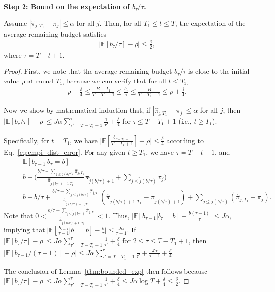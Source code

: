 \textbf{Step 2: Bound on the expectation of $b_{\tau}/\tau$.}
\begin{lemma} \label{thm:bounded_exp}
Assume $|\hat{\pi}_{j,T_1} - \pi_j| \leq \alpha$ for all $j$. Then, for all $T_1 \leq t \leq T$, the expectation of the average remaining budget satisfies
\begin{eqnarray}
|\mathbb{E}[b_{\tau}/\tau] - \rho| \leq \frac{\delta}{2},
\end{eqnarray}
where $\tau = T- t + 1$.
\end{lemma}
\begin{proof}
First, we note that the average remaining budget $b_{\tau}/\tau$ is close to the initial value $\rho$ at round $T_1$, because we can verify that for all $t \leq T_1$,
\begin{eqnarray} \label{eq:empi_dist_error}
\rho - \frac{\delta}{4}\leq \frac{B - T_1}{T-T_1+1} \leq \frac{b_{\tau}}{\tau} \leq \frac{B}{T-T_1+1} \leq \rho + \frac{\delta}{4}.
\end{eqnarray}

Now we show by mathematical induction that, if $|\hat{\pi}_{j,T_1} - \pi_j| \leq \alpha$ for all $j$, then $|\mathbb{E}[b_{\tau}/\tau] - \rho| \leq J\alpha\sum_{\tau' = T-T_1 + 1}^\tau\frac{1}{\tau'} + \frac{\delta}{4}$ for $\tau \leq T - T_1 + 1$ (i.e., $t \geq T_1$).

Specifically, for $t = T_1$, we have $\big|\mathbb{E}[\frac{b_{T-T_1 + 1}}{T-T_1+1}] - \rho\big|  \leq \frac{\delta}{4}$ according to Eq.~\eqref{eq:empi_dist_error}. For any given $t \geq T_1$, we have $\tau = T- t + 1$, and
\begin{eqnarray}
&&\mathbb{E}[b_{\tau - 1}|b_{\tau} = b] \nonumber \\
 &=& b - \bigg(\frac{b/\tau - \sum_{j\leq \tilde{j}(b/\tau)}\hat{\pi}_{j, T_1}}{\hat{\pi}_{\tilde{j}(b/\tau)+1, T_1}} \pi_{\tilde{j}(b/\tau)+1} + \sum_{j\leq \tilde{j}(b/\tau)} \pi_j\bigg) \nonumber \\
&=& b- b/\tau + \frac{b/\tau - \sum_{j\leq \tilde{j}(b/\tau)}\hat{\pi}_{j, T_1}}{\hat{\pi}_{\tilde{j}(b/\tau)+1, T_1}} (\hat{\pi}_{\tilde{j}(b/\tau)+1, T_1} - \pi_{\tilde{j}(b/\tau)+1}) +  \sum_{j\leq \tilde{j}(b/\tau)} (\hat{\pi}_{j,T_1} - \pi_j).\nonumber
\end{eqnarray}
Note that $0 < \frac{b/\tau - \sum_{j\leq \tilde{j}(b/\tau)}\hat{\pi}_{j, T_1}}{\hat{\pi}_{\tilde{j}(b/\tau)+1, T_1}} < 1$. Thus, $\big|\mathbb{E}[b_{\tau - 1}|b_{\tau} = b] - \frac{b(\tau-1)}{\tau}\big| \leq J\alpha$, implying that $\big|\mathbb{E}[\frac{b_{\tau - 1}}{\tau-1}|b_{\tau} = b] - \frac{b}{\tau}\big| \leq \frac{J\alpha}{\tau-1}$.
If $\big|\mathbb{E}[b_{\tau}/\tau] - \rho| \leq J\alpha\sum_{\tau' = T-T_1 + 1}^\tau\frac{1}{\tau'} + \frac{\delta}{4}$ for $2 \leq \tau \leq T - T_1 + 1$, then $\big|\mathbb{E}[b_{\tau-1}/(\tau-1)] - \rho| \leq J\alpha\sum_{\tau' = T-T_1 + 1}^\tau\frac{1}{\tau'} + \frac{J\alpha}{\tau-1} +   \frac{\delta}{4}$.

The conclusion of Lemma~\ref{thm:bounded_exp} then follows because $|\mathbb{E}[b_{\tau}/\tau] - \rho| \leq J\alpha\sum_{\tau' = T-T_1 + 1}^\tau\frac{1}{\tau'} + \frac{\delta}{4} \leq J\alpha \log T + \frac{\delta}{4} \leq \frac{\delta}{2}$.
\end{proof}

